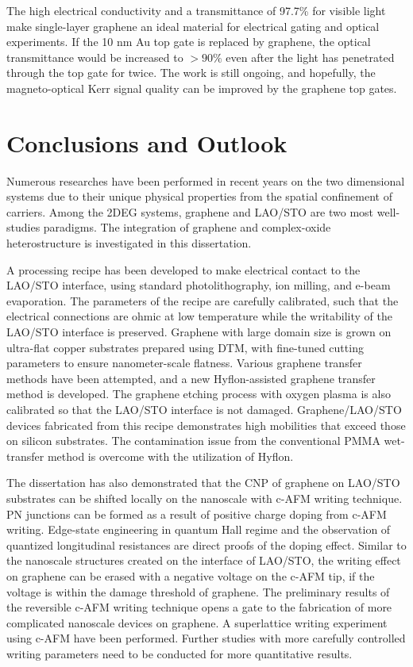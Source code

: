 \documentclass[pdflatex, sectionletters, 12pt, final, phd]{pittetd}    %
\begin{document}
The high electrical conductivity and a transmittance of 97.7\% for visible light\cite{nair2008fine} make single-layer graphene an ideal material for electrical gating and optical experiments. If the 10 nm Au top gate is replaced by graphene, the optical transmittance would be increased to $> 90\%$ even after the light has penetrated through the top gate for twice. The work is still ongoing, and hopefully, the magneto-optical Kerr signal quality can be improved by the graphene top gates.

\chapter{Conclusions and Outlook}

Numerous researches have been performed in recent years on the two dimensional systems due to their unique physical properties from the spatial confinement of carriers. Among the 2DEG systems, graphene and LAO/STO are two most well-studies paradigms. The integration of graphene and complex-oxide heterostructure is investigated in this dissertation. 

A processing recipe has been developed to make electrical contact to the LAO/STO interface, using standard photolithography, ion milling, and e-beam evaporation. The parameters of the recipe are carefully calibrated, such that the electrical connections are ohmic at low temperature while the writability of the LAO/STO interface is preserved. Graphene with large domain size is grown on ultra-flat copper substrates prepared using DTM, with fine-tuned cutting parameters to ensure nanometer-scale flatness. Various graphene transfer methods have been attempted, and a new Hyflon-assisted graphene transfer method is developed. The graphene etching process with oxygen plasma is also calibrated so that the LAO/STO interface is not damaged. Graphene/LAO/STO devices fabricated from this recipe demonstrates high mobilities that exceed those on silicon substrates. The contamination issue from the conventional PMMA wet-transfer method is overcome with the utilization of Hyflon.

The dissertation has also demonstrated that the CNP of graphene on LAO/STO substrates can be shifted locally on the nanoscale with c-AFM writing technique. PN junctions can be formed as a result of positive charge doping from c-AFM writing. Edge-state engineering in quantum Hall regime and the observation of quantized longitudinal resistances are direct proofs of the doping effect. Similar to the nanoscale structures created on the interface of LAO/STO, the writing effect on graphene can be erased with a negative voltage on the c-AFM tip, if the voltage is within the damage threshold of graphene. The preliminary results of the reversible c-AFM writing technique opens a gate to the fabrication of more complicated nanoscale devices on graphene. A superlattice writing experiment using c-AFM have been performed. Further studies with more carefully controlled writing parameters need to be conducted for more quantitative results.
\end{document}
